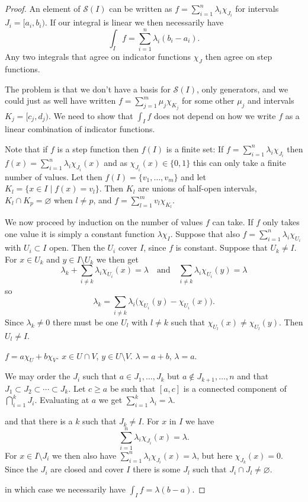 \documentclass[11pt]{amsart}
\theoremstyle{definition}
\newcommand{\cc}[1]{\mathcal{#1}}
\def\qandq{\quad\text{and}\quad}
\def\empty{\varnothing}
\begin{document}
\begin{proof}
An element of $\cc S(I)$ can be written as $f = \sum_{i=1}^n \lambda_i \chi_{J_i}$ for intervals $J_i = [a_i,b_i)$.
If our integral is linear we then necessarily have
\[
\int_I f = \sum_{i=1}^n \lambda_i (b_i - a_i).
\]
Any two integrals that agree on indicator functions $\chi_J$ then agree on step functions.

The problem is that we don't have a basis for $\cc S(I)$, only generators, and we could just as well have written $f = \sum_{j=1}^m \mu_j \chi_{K_j}$ for some other $\mu_j$ and intervals $K_j = [c_j,d_j)$.
We need to show that $\int_I f$ does not depend on how we write $f$ as a linear combination of indicator functions.


Note that if $f$ is a step function then $f(I)$ is a finite set:
If $f = \sum_{i=1}^n \lambda_i \chi_{J_i}$ then $f(x) = \sum_{i=1}^n \lambda_i \chi_{J_i}(x)$ and as $\chi_{J_i}(x) \in \{0,1\}$ this can only take a finite number of values.
Let then $f(I) = \{v_1, \ldots, v_m\}$ and let $K_l = \{x \in I \mid f(x) = v_l \}$.
Then $K_l$ are unions of half-open intervals, $K_l \cap K_p = \empty$ when $l \not= p$, and $f = \sum_{l=1}^m v_l \chi_{K_l}$.


We now proceed by induction on the number of values $f$ can take.
If $f$ only takes one value it is simply a constant function $\lambda \chi_I$.
Suppose that also $f = \sum_{i=1}^n \lambda_i \chi_{U_i}$ with $U_i \subset I$ open.
Then the $U_i$ cover $I$, since $f$ is constant.
Suppose that $U_k \not= I$.
For $x \in U_k$ and $y \in I \setminus U_k$ we then get
\[
\lambda_k + \sum_{i\not=k} \lambda_i \chi_{U_i}(x) = \lambda
\qandq
\sum_{i\not=k} \lambda_i \chi_{U_i}(y) = \lambda
\]
so
\[
\lambda_k = \sum_{i\not=k} \lambda_i\bigl(\chi_{U_i}(y) - \chi_{U_i}(x)\bigr).
\]
Since $\lambda_k \not= 0$ there must be one $U_l$ with $l \not= k$ such that $\chi_{U_l}(x) \not= \chi_{U_l}(y)$.
Then $U_l \not= I$.

$f = a \chi_U + b \chi_V$.
$x \in U \cap V$, $y \in U \setminus V$.
$\lambda = a + b$, $\lambda = a$.

We may order the $J_i$ such that $a \in J_1, \ldots, J_k$ but $a \not\in J_{k+1}, \ldots, n$ and that $J_1 \subset J_2 \subset \cdots \subset J_k$.
Let $c \geq a$ be such that $[a,c]$ is a connected component of $\bigcap_{i=1}^k J_i$.
Evaluating at $a$ we get $\sum_{i=1}^k \lambda_i = \lambda$.

and that there is a $k$ such that $J_k \not= I$.
For $x$ in $I$ we have
\[
\sum_{i=1}^n \lambda_i \chi_{J_i}(x) = \lambda.
\]
For $x \in I \setminus J_i$ we then also have $\sum_{i=1}^n \lambda_i \chi_{J_i}(x) = \lambda$, but here $\chi_{J_k}(x) = 0$.
Since the $J_i$ are closed and cover $I$ there is some $J_l$ such that $J_i \cap J_l \not= \empty$.

in which case we necessarily have $\int_I f = \lambda (b - a)$.
\end{proof}
\end{document}
